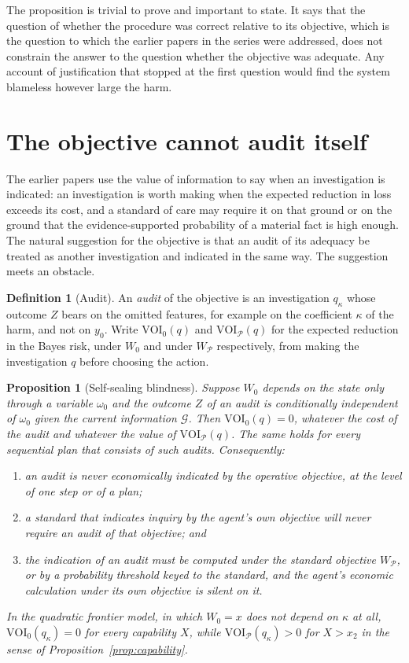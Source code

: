 \documentclass[11pt]{article}
\newcommand{\G}{\mathcal G}
\newcommand{\VOI}{\mathrm{VOI}}
\theoremstyle{plain}
\newtheorem{proposition}{Proposition}
\theoremstyle{definition}
\newtheorem{definition}{Definition}
\begin{document}
The proposition is trivial to prove and important to state. It says that the question of whether the procedure was correct relative to its objective, which is the question to which the earlier papers in the series were addressed, does not constrain the answer to the question whether the objective was adequate. Any account of justification that stopped at the first question would find the system blameless however large the harm.

\section{The objective cannot audit itself}\label{sec:sealing}

The earlier papers use the value of information to say when an investigation is indicated: an investigation is worth making when the expected reduction in loss exceeds its cost, and a standard of care may require it on that ground or on the ground that the evidence-supported probability of a material fact is high enough. The natural suggestion for the objective is that an audit of its adequacy be treated as another investigation and indicated in the same way. The suggestion meets an obstacle.

\begin{definition}[Audit]\label{def:audit}
An \emph{audit} of the objective is an investigation $q_\kappa$ whose outcome $Z$ bears on the omitted features, for example on the coefficient $\kappa$ of the harm, and not on $y_0$. Write $\VOI_0(q)$ and $\VOI_{\mathcal P}(q)$ for the expected reduction in the Bayes risk, under $W_0$ and under $W_{\mathcal P}$ respectively, from making the investigation $q$ before choosing the action.
\end{definition}

\begin{proposition}[Self-sealing blindness]\label{prop:sealing}
Suppose $W_0$ depends on the state only through a variable $\omega_0$ and the outcome $Z$ of an audit is conditionally independent of $\omega_0$ given the current information $\G$. Then $\VOI_0(q)=0$, whatever the cost of the audit and whatever the value of $\VOI_{\mathcal P}(q)$. The same holds for every sequential plan that consists of such audits. Consequently:
\begin{enumerate}[label=(\roman*),nosep]
\item an audit is never economically indicated by the operative objective, at the level of one step or of a plan;
\item a standard that indicates inquiry by the agent's own objective will never require an audit of that objective; and
\item the indication of an audit must be computed under the standard objective $W_{\mathcal P}$, or by a probability threshold keyed to the standard, and the agent's economic calculation under its own objective is silent on it.
\end{enumerate}
In the quadratic frontier model, in which $W_0=x$ does not depend on $\kappa$ at all, $\VOI_0(q_\kappa)=0$ for every capability $X$, while $\VOI_{\mathcal P}(q_\kappa)>0$ for $X>x_2$ in the sense of Proposition~\ref{prop:capability}.
\end{proposition}
\end{document}
